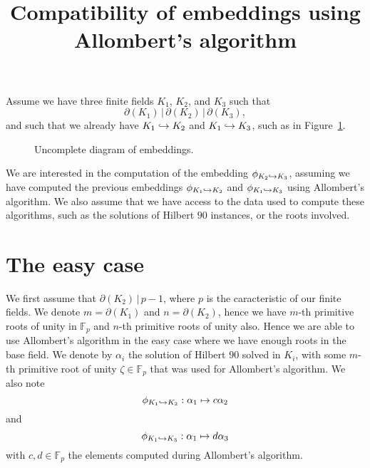 \documentclass[a4paper,11pt]{article}
\title{Compatibility of embeddings using Allombert's algorithm}
\author{}
\begin{document}
\maketitle





Assume we have three finite fields $K_1$, $K_2$, and $K_3$ such that
\[\partial(K_1)\,|\,\partial(K_2)\,|\,\partial(K_3),\]
and such that we already have $K_1\hookrightarrow K_2$ and $K_1\hookrightarrow K_3$, \ie such as in
Figure~\ref{fig:uncomplete}.
\begin{figure}
  \centering

  \caption{Uncomplete diagram of embeddings.}
  \label{fig:uncomplete}
\end{figure}
We are interested in the computation of the embedding $\phi_{K_2\hookrightarrow K_3}$,
assuming we have computed the previous embeddings $\phi_{K_1\hookrightarrow K_2}$ and
$\phi_{K_1\hookrightarrow K_3}$ using Allombert's algorithm. We also assume that we have access
to the data used to compute these algorithms, such as the solutions of Hilbert
$90$ instances, or the roots involved.

\section{The easy case}
\label{sec:easy}

We first assume that $\partial(K_2)\,|\,p-1$, where $p$ is the caracteristic of
our finite fields. We denote $m=\partial(K_1)$ and $n=\partial(K_2)$, hence we
have $m$-th primitive roots of unity in $\mathbb{F}_p$ and $n$-th primitive
roots of unity also. Hence we are able to use Allombert's algorithm in the easy
case where we have enough roots in the base field. We denote by $\alpha_i$ the
solution of Hilbert $90$ solved in $K_i$, with some $m$-th primitive root of
unity $\zeta\in\mathbb{F}_p$ that was used for Allombert's algorithm. We also
note 
\[\phi_{K_1\hookrightarrow K_2}:\alpha_1\mapsto c\alpha_2
\]
and
\[\phi_{K_1\hookrightarrow K_3}:\alpha_1\mapsto d\alpha_3
\]
with $c, d\in\mathbb{F}_p$ the
elements computed during Allombert's algorithm.
\end{document}
